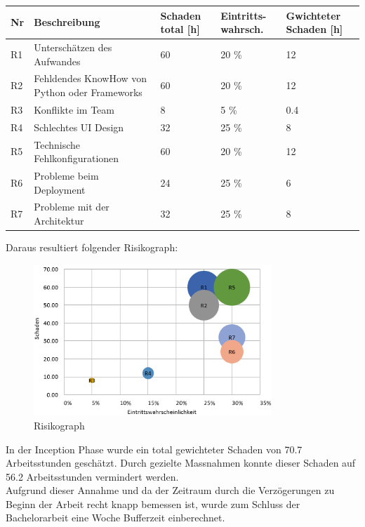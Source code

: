 \renewcommand{\arraystretch}{1.2}
\begin{table}[h]
	\centering
	\begin{tabu} to 0.9
	\toprule
	Nr & Beschreibung & Schaden total [h] & Eintritts-wahrsch. & Gwichteter Schaden [h]\\ 
	\midrule
	R1 & Unterschätzen des Aufwandes & 60 & 20 \% & 12 \\
	R2 & Fehldendes KnowHow von \newline Python oder Frameworks & 60 & 20 \% & 12 \\
	R3 & Konflikte im Team & 8 & 5 \% & 0.4 \\
	R4 & Schlechtes UI Design & 32 & 25 \% & 8 \\
	R5 & Technische \newline Fehlkonfigurationen & 60 & 20 \% & 12 \\
	R6 & Probleme beim Deployment & 24 & 25 \% & 6 \\ 
	R7 & Probleme mit der Architektur & 32 & 25 \% & 8 \\
	\bottomrule
	\end{tabu}
\end{table}

\newpage
Daraus resultiert folgender Risikograph: 
\begin{figure}[H]
	\begin{center}
	
	\includegraphics[width=0.8\textwidth,height=\textheight,keepaspectratio]{images/risikoanalyse.png}
	\caption{Risikograph}
	\end{center}
\end{figure}

\noindent In der Inception Phase wurde ein total gewichteter Schaden von 70.7 Arbeitsstunden geschätzt. Durch gezielte Massnahmen konnte dieser Schaden auf 56.2 Arbeitsstunden vermindert werden. \\
Aufgrund dieser Annahme und da der Zeitraum durch die Verzögerungen zu Beginn der Arbeit recht knapp bemessen ist, wurde zum Schluss der Bachelorarbeit eine Woche Bufferzeit einberechnet. 

